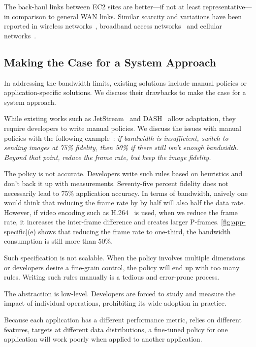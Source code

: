 The back-haul links between EC2 sites are better---if not at least
representative---in comparison to general WAN links. Similar scarcity and
variations have been reported in wireless networks~\cite{biswas2015large},
broadband access networks~\cite{grover2013peeking, sundaresan2014bismark} and
cellular networks~\cite{nikravesh2014mobile}.

\subsection{Making the Case for a System Approach}
\label{sec:making-case-sys-approach}

In addressing the bandwidth limits, existing solutions include manual policies
or application-specific solutions. We discuss their drawbacks to make the case
for a system approach.

 While existing works such as
JetStream~\cite{rabkin2014aggregation} and DASH~\cite{sodagar2011mpeg} allow
adaptation, they require developers to write manual policies. We discuss the
issues with manual policies with the following
example~\cite{rabkin2014aggregation}: \textit{if bandwidth is insufficient,
  switch to sending images at 75\% fidelity, then 50\% if there still isn't
  enough bandwidth. Beyond that point, reduce the frame rate, but keep the image
  fidelity.}

The policy is not accurate. Developers write such rules based on heuristics and
don't back it up with measurements. Seventy-five percent fidelity does not
necessarily lead to 75\% application accuracy. In terms of bandwidth, naively
one would think that reducing the frame rate by by half will also half the data
rate. However, if video encoding such as H.264~\cite{richardson2011h} is used,
when we reduce the frame rate, it increases the inter-frame difference and
creates larger P-frames. \autoref{fig:app-specific}(e) shows that reducing the
frame rate to one-third, the bandwidth consumption is still more than 50\%.

Such specification is not scalable. When the policy involves multiple dimensions
or developers desire a fine-grain control, the policy will end up with too many
rules.  Writing such rules manually is a tedious and error-prone process.

The abstraction is low-level. Developers are forced to study and measure the
impact of individual operations, prohibiting its wide adoption in practice.

 Because each application
has a different performance metric, relies on different features, targets at
different data distributions, a fine-tuned policy for one application will work
poorly when applied to another application.


